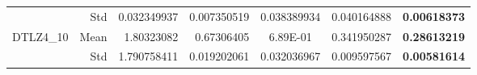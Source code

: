 \begin{table*}[htbp]
\begin{tabular}{rrrrrrr}
          & Std   & 0.032349937 & 0.007350519 & \multicolumn{1}{c}{0.038389934} & 0.040164888 & \textbf{0.00618373} \\
    \multirow{2}[0]{*}{DTLZ4\_10} & Mean  & 1.80323082 & 0.67306405 & \multicolumn{1}{c}{6.89E-01} & 0.341950287 & \textbf{0.28613219} \\
          & Std   & 1.790758411 & 0.019202061 & \multicolumn{1}{c}{0.032036967} & 0.009597567 & \textbf{0.00581614} \\
    \bottomrule
    \end{tabular}%
  \label{tab:IGD_DTLZ}%
\end{table*}%
